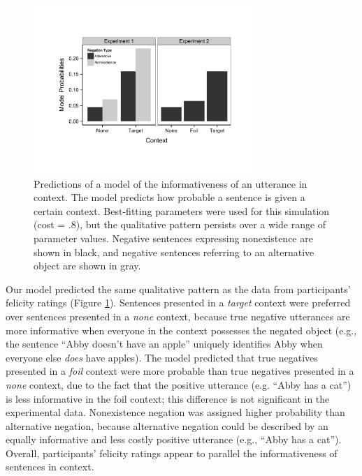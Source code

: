 \documentclass[10pt,letterpaper]{article}
\begin{document}
\begin{figure}[t]
\begin{center} 
\includegraphics[width=3.25in]{figures/model_predictions.pdf}
\caption{\label{fig:model} Predictions of a model of the informativeness of an utterance in context.  The model predicts how probable a sentence is given a certain context.  Best-fitting parameters were used for this simulation (cost = .8), but the qualitative pattern persists over a wide range of parameter values.  Negative sentences expressing nonexistence are shown in black, and negative sentences referring to an alternative object are shown in gray.}
\vspace{-.2cm}
\end{center} 
\end{figure}

Our model predicted the same qualitative pattern as the data from participants' felicity ratings (Figure \ref{fig:model}).  Sentences presented in a \emph{target} context were preferred over sentences presented in a \emph{none} context, because true negative utterances are more informative when everyone in the context possesses the negated object (e.g., the sentence ``Abby doesn't have an apple'' uniquely identifies Abby when everyone else \emph{does} have apples).  The model predicted that true negatives presented in a \emph{foil} context were more probable than true negatives presented in a \emph{none} context, due to the fact that the positive utterance (e.g. ``Abby has a cat'')  is less informative in the foil context; this difference is not significant in the experimental data.  Nonexistence negation was assigned higher probability than alternative negation, because alternative negation could be described by an equally informative and less costly positive utterance (e.g., ``Abby has a cat'').  Overall, participants' felicity ratings appear to parallel the informativeness of sentences in context.  
\end{document}
